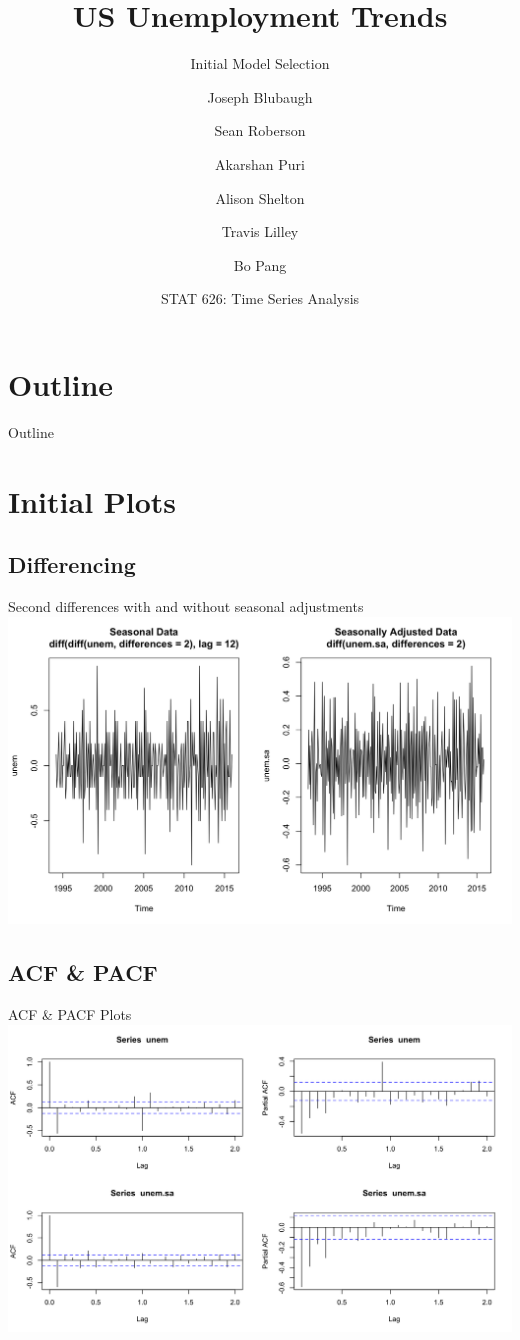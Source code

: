 \documentclass{beamer}
\title[Unemployment Trends] %
{US Unemployment Trends}
\subtitle
{Initial Model Selection}
\author[Group 4]{Joseph Blubaugh \and Sean Roberson \and Akarshan Puri \and 
	Alison Shelton \and Travis Lilley \and Bo Pang}
\institute[Texas A\&M] %
{Texas A\&M\\ College Station, Texas}
\date[STAT 626] %
{STAT 626: Time Series Analysis}
\begin{document}
\begin{frame}
  \titlepage
\end{frame}
\section*{Outline}
\begin{frame}{Outline}
  \tableofcontents
\end{frame}

\section{Initial Plots}

   \subsection{Differencing}
  \begin{frame}{Second differences with and without seasonal adjustments}
  \includegraphics[width=\linewidth]{images/stationarity}
  \end{frame}
  
  
  \subsection{ACF \& PACF}
  \begin{frame}{ACF \& PACF Plots}
  \includegraphics[width=\linewidth]{images/acfpacf}
  \end{frame}
 
\end{document}

